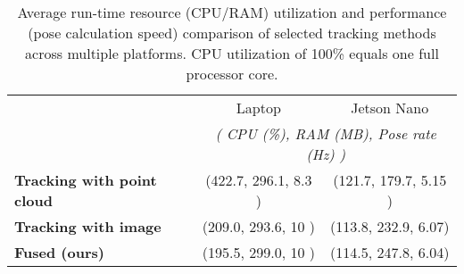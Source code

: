 \begin{table}[t]
    \centering
    \caption{ Average run-time resource (CPU/RAM) utilization and performance (pose calculation speed) comparison of selected tracking methods across multiple platforms. CPU utilization of 100\% equals one full processor core. } 
    \begin{tabular}{@{}lcc@{}}
        \toprule
         & Laptop & Jetson Nano  \\
        & \multicolumn{2}{c}{\textit{( CPU (\%), RAM (MB), Pose rate (Hz) )}} \\%
        \midrule
        \textbf{Tracking with point cloud} & (422.7, 296.1, 8.3 ) & (121.7, 179.7, 5.15 )  \\
        \textbf{Tracking with image} & (209.0, 293.6, 10 ) & (113.8, 232.9, 6.07)   \\
        \textbf{Fused (ours)} & (195.5, 299.0, 10 ) & (114.5, 247.8, 6.04)    \\ \bottomrule
    \end{tabular}
    \label{tab:runtime_src}
\end{table}